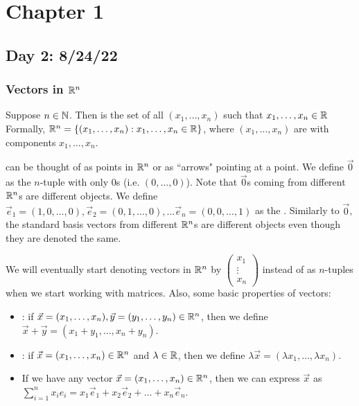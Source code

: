 \documentclass[main.tex]{subfiles}
\begin{document}
\section{Chapter 1}
\subsection{Day 2: 8/24/22}

\subsubsection{Vectors in $\mathbb R^n$}
\begin{definition}
    Suppose $n\in \mathbb N$. Then  is the set of all $(x_1, \ldots , x_n)$ such that $x_1, \ldots , x_n\in \mathbb R$ Formally, $\mathbb R^n = \{(x_1, \ldots , x_n) : x_1, \ldots , x_n\in \mathbb R\}$, where $(x_1, \ldots , x_n)$ are  with components $x_1, \ldots , x_n$.
\end{definition}

\begin{definition}[Vectors]
     can be thought of as points in $\mathbb R^n$ or as ``arrows" pointing at a point. We define $\vec{0}$ as the $n$-tuple with only 0s (i.e. $(0, \ldots , 0)$). Note that $\vec{0}$s coming from different $\mathbb R^n$s are different objects. We define $\vec{e}_1 = (1, 0, \ldots , 0), \vec{e}_2 = (0, 1, \ldots , 0), \ldots \vec{e}_n = (0, 0, \ldots , 1)$ as the . Similarly to $\vec{0}$, the standard basis vectors from different $\mathbb R^n$s are different objects even though they are denoted the same.
\end{definition}

We will eventually start denoting vectors in $\mathbb R^n$ by $\begin{pmatrix} x_1 \\ \vdots \\ x_n\end{pmatrix}$ instead of as $n$-tuples when we start working with matrices. Also, some basic properties of vectors:
\begin{itemize}
    \item {}: if $\vec{x} = (x_1, \ldots , x_n), \vec{y} = (y_1, \ldots , y_n)\in \mathbb R^n$, then we define $\vec{x} + \vec{y} = (x_1 + y_1, \ldots , x_n + y_n)$.
    \item {}: if $\vec{x} = (x_1, \ldots , x_n)\in \mathbb R^n$ and $\lambda\in \mathbb R$, then we define $\lambda\vec{x} = (\lambda x_1, \ldots , \lambda x_n)$.
    \item If we have any vector $\vec{x} = (x_1, \ldots , x_n)\in \mathbb R^n$, then we can express $\vec{x}$ as $\sum_{i = 1}^n x_ie_i = x_1\vec{e}_1 + x_2\vec{e}_2 + \ldots + x_n\vec{e}_n$.
\end{itemize}
\end{document}
